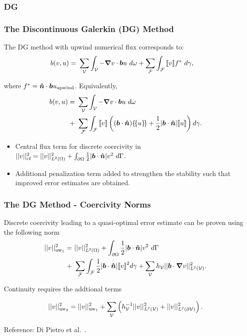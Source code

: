 \subsubsection{DG}

\begin{frame}
\frametitle{The Discontinuous Galerkin (DG) Method}

The DG method with upwind numerical flux corresponds to:
\begin{align}
b(v,u)
=\ & \sum_{\fe{V}} \int_{\fe{V}} - \nabla v \cdot \varv{b} u\ d\omega
+ \sum_{\fe{F}} \int_{\fe{F}} \jump{v} f^*\ d\gamma,
\end{align}

where $f^* = \mathit{\bm{{\hat{n}}}} \cdot \mathit{\bm{{b}}} u_\text{upwind}$. Equivalently,
\begin{align}
b(v,u)
=\ & \sum_{\fe{V}} \int_{\fe{V}} - \nabla v \cdot \varv{b} u\ d\omega \\
  +\ & \sum_{\fe{F}} \int_{\fe{F}} \jump{v}
       \left(
       (\varv{b} \cdot \varv{\hat{n}}) \avg{u} +
       \frac{1}{2} |\varv{b} \cdot \varv{\hat{n}}| \jump{u}
       \right) d\gamma.
\end{align}

\begin{itemize}
  \item Central flux term for discrete coercivity in $||v||^2_\text{cf} =
    ||v||^2_{\mathit{{{L}}}^2(\Omega)} + \int_{\partial \Omega} \frac{1}{2}
    |\mathit{\bm{{b}}} \cdot \mathit{\bm{{\hat{n}}}}| v^2\ d\Gamma$.
  \item Additional penalization term added to strengthen the stability such that
    improved error estimates are obtained.
\end{itemize}

\end{frame}

\begin{frame}
\frametitle{The DG Method - Coercivity Norms}

Discrete coercivity leading to a quasi-optimal error estimate can be proven
using the following norm
\begin{align}
  ||v||^2_\text{uw$_1$}
  =\ &
  ||v||^2_{\fspace{L}^2(\Omega)}
  +
  \int_{\partial \Omega} \frac{1}{2} |\varv{b} \cdot \varv{\hat{n}}| v^2\ d\Gamma \\
  +\ &
  \sum_{\fe{F}} \int_{\fe{F}} \frac{1}{2} |\varv{b} \cdot \varv{\hat{n}}| \jump{v}^2 d\gamma
  +
  \sum_{\fe{V}} h_\fe{V} || \varv{b} \cdot \nabla v ||^2_{\fspace{L^2(\fe{V})}}.
\end{align}

Continuity requires the addtional terms

\begin{align}
  ||v||^2_\text{uw$_2$}
  =
  ||v||^2_\text{uw$_1$}
  +
  \sum_{\mathcal{{{V}}}} \left( h_{\mathcal{{{V}}}}^{-1} || v ||^2_{\mathit{{{L^2(\mathcal{{{V}}})}}}} + || v ||^2_{\mathit{{{L^2(\partial \mathcal{{{V}}})}}}} \right).
\end{align}

Reference: Di Pietro et al.~\cite{DiPietro2011}.

\end{frame}
